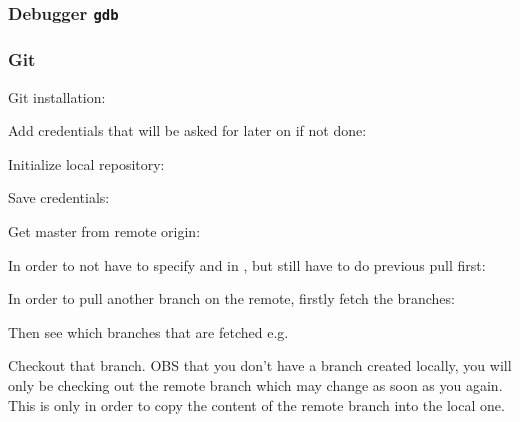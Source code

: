 \subsubsection{Debugger \texttt{gdb}}


\subsubsection{Git}
Git installation:


Add credentials that will be asked for later on if not done:



Initialize local repository:



Save credentials:


Get master from remote origin:


In order to not have to specify  and  in , but still have to do previous pull first:



In order to pull another branch on the remote, firstly fetch the branches:


Then see which branches that are fetched e.g.


Checkout that branch. OBS that you don't have a branch created locally, you will only be checking out the remote branch which may change as soon as you  again. This is only in order to copy the content of the remote branch into the local one.

